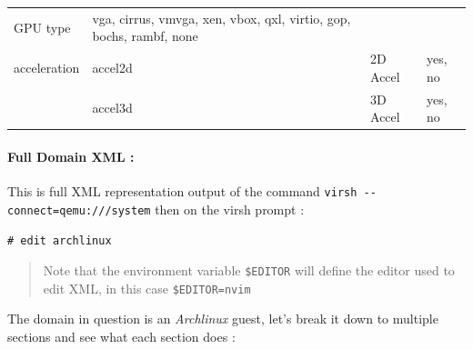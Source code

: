 \documentclass[
  14pt,
  english,
  a4paper,
]{scrreprt}
\begin{document}
\begin{longtable}[]{@{}llll@{}}
\begin{minipage}[t]{0.09\columnwidth}
GPU type\strut
\end{minipage} & \begin{minipage}[t]{0.57\columnwidth}\raggedright
vga, cirrus, vmvga, xen, vbox, qxl, virtio, gop, bochs, rambf,
none\strut
\end{minipage}\tabularnewline
\begin{minipage}[t]{0.12\columnwidth}\raggedright
acceleration\strut
\end{minipage} & \begin{minipage}[t]{0.10\columnwidth}\raggedright
accel2d\strut
\end{minipage} & \begin{minipage}[t]{0.09\columnwidth}\raggedright
2D Accel\strut
\end{minipage} & \begin{minipage}[t]{0.57\columnwidth}\raggedright
yes, no\strut
\end{minipage}\tabularnewline
\begin{minipage}[t]{0.12\columnwidth}\raggedright
\strut
\end{minipage} & \begin{minipage}[t]{0.10\columnwidth}\raggedright
accel3d\strut
\end{minipage} & \begin{minipage}[t]{0.09\columnwidth}\raggedright
3D Accel\strut
\end{minipage} & \begin{minipage}[t]{0.57\columnwidth}\raggedright
yes, no\strut
\end{minipage}\tabularnewline
\bottomrule
\end{longtable}

\hypertarget{full-domain-xml}{%
\paragraph{Full Domain XML :}\label{full-domain-xml}}

This is full XML representation output of the command
\texttt{virsh\ -\/-connect=qemu:///system} then on the virsh prompt :

\texttt{\#\ edit\ archlinux}

\begin{quote}
Note that the environment variable \texttt{\$EDITOR} will define the
editor used to edit XML, in this case \texttt{\$EDITOR=nvim}
\end{quote}

The domain in question is an \emph{Archlinux} guest, let's break it down
to multiple sections and see what each section does :
\end{document}
